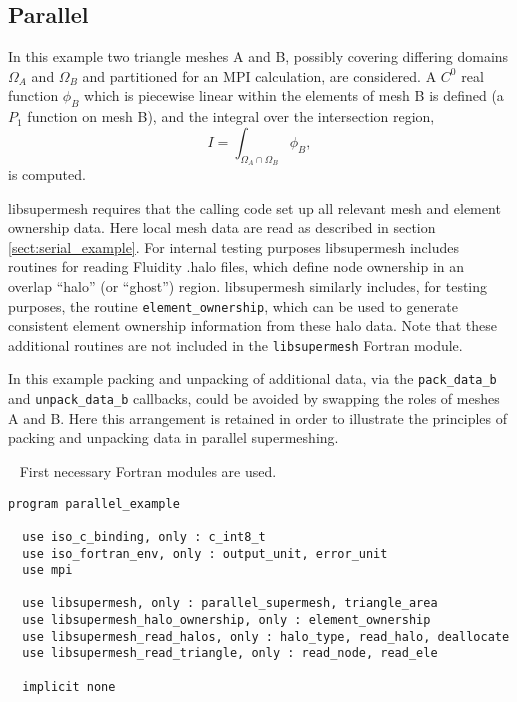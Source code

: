 \documentclass{article}
\begin{document}
\subsection{Parallel}

In this example two triangle meshes A and B, possibly covering differing domains
$\Omega_A$ and $\Omega_B$ and partitioned for an MPI calculation, are
considered. A $C^0$ real function $\phi_B$ which is piecewise linear within the
elements of mesh B is defined (a $P_1$ function on mesh B), and the integral
over the intersection region,
\begin{equation*}
  I = \int_{\Omega_A \cap \Omega_B} \phi_B,
\end{equation*}
is computed.

libsupermesh requires that the calling code set up all relevant mesh and element
ownership data. Here local mesh data are read as described in section
\ref{sect:serial_example}. For internal testing purposes libsupermesh includes
routines for reading Fluidity .halo files, which define node ownership in an
overlap ``halo'' (or ``ghost'') region. libsupermesh similarly includes, for
testing purposes, the routine \verb+element_ownership+, which can be used to
generate consistent element ownership information from these halo data. Note
that these additional routines are not included in the \verb+libsupermesh+
Fortran module.

In this example packing and unpacking of additional data, via the
\verb+pack_data_b+ and \linebreak \verb+unpack_data_b+ callbacks, could be
avoided by swapping the roles of meshes A and B. Here this arrangement is
retained in order to illustrate the principles of packing and unpacking data in
parallel supermeshing.

~\newline
First necessary Fortran modules are used.
\begin{lstlisting}[language=FORTRAN]
program parallel_example

  use iso_c_binding, only : c_int8_t
  use iso_fortran_env, only : output_unit, error_unit
  use mpi
  
  use libsupermesh, only : parallel_supermesh, triangle_area
  use libsupermesh_halo_ownership, only : element_ownership
  use libsupermesh_read_halos, only : halo_type, read_halo, deallocate
  use libsupermesh_read_triangle, only : read_node, read_ele

  implicit none
\end{lstlisting}
\end{document}
